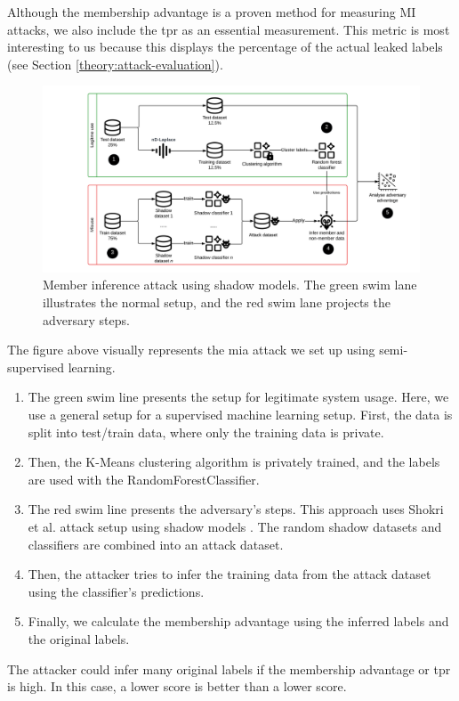 \begin{enumerate}
        Although the membership advantage is a proven method for measuring MI attacks, we also include the \gls{tpr} as an essential measurement.
        This metric is most interesting to us because this displays the percentage of the actual leaked labels (see Section \ref{theory:attack-evaluation}).
        \begin{figure}[H]
          \includegraphics[width=1.1\textwidth]{Method/images/MI-setup.png}
          \caption{Member inference attack using shadow models. The green swim lane illustrates the normal setup, and the red swim lane projects the adversary steps.}
          \label{figure:mi-attack}
        \end{figure}
        The figure above visually represents the \gls{mia} attack we set up using semi-supervised learning.
        \begin{enumerate}
          \item The green swim line presents the setup for legitimate system usage.
                Here, we use a general setup for a supervised machine learning setup.
                First, the data is split into test/train data, where only the training data is private.
          \item Then, the K-Means clustering algorithm is privately trained, and the labels are used with the RandomForestClassifier.
          \item The red swim line presents the adversary's steps.
                This approach uses Shokri et al. attack setup using shadow models \citep{shokri_membership_2017}.
                The random shadow datasets and classifiers are combined into an attack dataset.
          \item Then, the attacker tries to infer the training data from the attack dataset using the classifier's predictions.
          \item Finally, we calculate the membership advantage using the inferred labels and the original labels.
        \end{enumerate}
        The attacker could infer many original labels if the membership advantage or \gls{tpr} is high.
        In this case, a lower score is better than a lower score.
\end{enumerate}
\newpage
%
